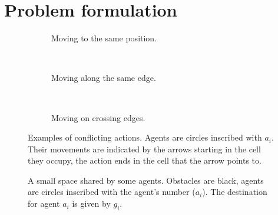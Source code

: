 \section{Problem formulation}\label{sec:problem}

\begin{figure}[t]
    \centering
    \begin{subfigure}[b]{.18\textwidth}
        \centering
        \def\svgscale{.7}
        
        \caption{Moving to the same position.}
        \label{fig:conflict-position}
    \end{subfigure}
    ~
    \begin{subfigure}[b]{.13\textwidth}
        \centering
        \def\svgscale{.7}
        
        \caption{Moving along the same edge.}
        \label{fig:conflict-same}
    \end{subfigure}
    ~
    \begin{subfigure}[b]{.13\textwidth}
        \centering
        \def\svgscale{.7}
        
        \caption{Moving on crossing edges.}
        \label{fig:conflict-crossing}
    \end{subfigure}
    \caption{Examples of conflicting actions. Agents are circles inscribed with
        $a_i$. Their movements are indicated by the arrows starting in the cell
        they occupy, the action ends in the cell that the arrow points to.}
    \label{fig:conflicts}
\end{figure}

\begin{figure}[t]
    \centering
    \def\svgscale{.7}
    
    \caption{A small space shared by some agents. Obstacles are black, agents
        are circles inscribed with the agent's number ($a_i$). The destination
        for agent $a_i$ is given by $g_i$.}
    \label{fig:world}
\end{figure}

